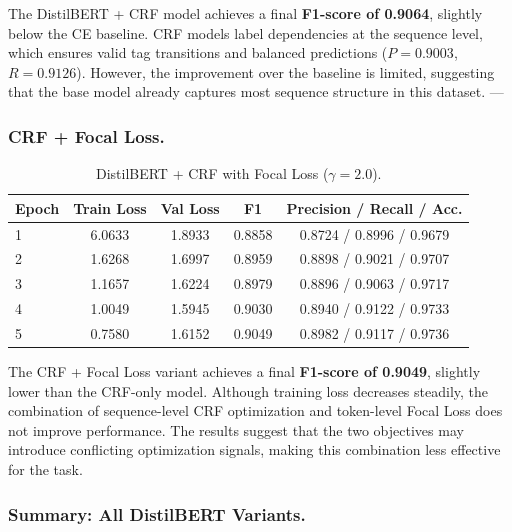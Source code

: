 The DistilBERT + CRF model achieves a final \textbf{F1-score of 0.9064}, slightly below the CE baseline. 
CRF models label dependencies at the sequence level, which ensures valid tag transitions and balanced predictions ($P = 0.9003$, $R = 0.9126$). 
However, the improvement over the baseline is limited, suggesting that the base model already captures most sequence structure in this dataset.
---

\subsubsection{CRF + Focal Loss.}

\begin{table}[H]
\centering
\caption{DistilBERT + CRF with Focal Loss ($\gamma = 2.0$).}
\begin{tabular}{lcccc}
\hline
\textbf{Epoch} & \textbf{Train Loss} & \textbf{Val Loss} & \textbf{F1} & \textbf{Precision} / \textbf{Recall} / \textbf{Acc.} \\
\hline
1 & 6.0633 & 1.8933 & 0.8858 & 0.8724 / 0.8996 / 0.9679 \\
2 & 1.6268 & 1.6997 & 0.8959 & 0.8898 / 0.9021 / 0.9707 \\
3 & 1.1657 & 1.6224 & 0.8979 & 0.8896 / 0.9063 / 0.9717 \\
4 & 1.0049 & 1.5945 & 0.9030 & 0.8940 / 0.9122 / 0.9733 \\
5 & 0.7580 & 1.6152 & 0.9049 & 0.8982 / 0.9117 / 0.9736 \\
\hline
\end{tabular}
\label{tab:distilbert_crf_focal}
\end{table}

The CRF + Focal Loss variant achieves a final \textbf{F1-score of 0.9049}, slightly lower than the CRF-only model. 
Although training loss decreases steadily, the combination of sequence-level CRF optimization and token-level Focal Loss does not improve performance. 
The results suggest that the two objectives may introduce conflicting optimization signals, making this combination less effective for the task.

\subsubsection{Summary: All DistilBERT Variants.}

